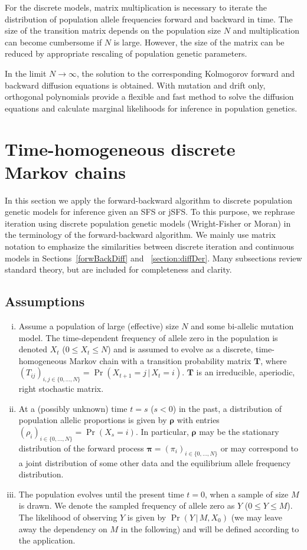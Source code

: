 \documentclass[preprint]{elsarticle}
\newcommand{\bs}[1]{\ensuremath{\boldsymbol{#1}}}
\newcommand\given{{\,|\,}}
\newcommand\x[1]{\ensuremath{X_{#1}}}
\newcommand\y{\ensuremath{Y}}
\newcommand\s{\ensuremath{s}}
\begin{document}
For the discrete models, matrix multiplication is necessary to iterate the distribution of population allele frequencies forward and backward in time. The size of the transition matrix depends on the population size $N$ and multiplication can become cumbersome if $N$ is large. However, the size of the matrix can be reduced by appropriate rescaling of population genetic parameters.

In the limit $N\to\infty$, the solution to the corresponding Kolmogorov forward and backward diffusion equations is obtained. With mutation and drift only, orthogonal polynomials provide a flexible and fast method to solve the diffusion equations and calculate marginal likelihoods for inference in population genetics.

\section{Time-homogeneous discrete Markov chains}

In this section we apply the forward-backward algorithm to discrete population genetic models for inference given an SFS or jSFS. To this purpose, we rephrase iteration using discrete population genetic models (Wright-Fisher or Moran) in the terminology of the forward-backward algorithm. We mainly use matrix notation to emphasize the similarities between discrete iteration and continuous models in Sections~\ref{forwBackDiff} and ~\ref{section:diffDer}. Many subsections review standard theory, but are included for completeness and clarity. 

\subsection{Assumptions}\label{section:assumptions}
\begin{enumerate}[(i)]
\item Assume a population of large (effective) size $N$ and some bi-allelic mutation model. The time-dependent frequency of allele zero in the population is denoted $\x{t}$ ($0 \le \x{t} \le N$) and is assumed to evolve as a discrete, time-homogeneous Markov chain with a transition probability matrix $\mathbf{T}$, where $(T_{ij})_{i,j \in \{0, \ldots, N\}} = \Pr(\x{t+1}=j \given \x{t}=i)$. $\mathbf{T}$ is an irreducible, aperiodic, right stochastic matrix.
\item At a (possibly unknown) time $t=\s$ ($\s<0$) in the past, a distribution of population allelic proportions is given by $\bs{\rho}$ with entries $(\rho_{i})_{i \in \{0, \ldots, N\}} = \Pr(\x{\s}=i)$.  In particular, $\bs{\rho}$ may be the stationary distribution of the forward process $\bs{\pi}=(\pi_i)_{i \in \{0, \ldots, N\}}$ or may correspond to a joint distribution of some other data and the equilibrium allele frequency distribution. 
\item The population evolves until the present time $t=0$, when a sample of size $M$ is drawn.  We denote the sampled frequency of allele zero as $\y$ ($0 \le \y \le M$). The likelihood of observing $\y$ is given by $\Pr(\y \given M, \x{0})$ (we may leave away the dependency on $M$ in the following) and will be defined according to the application.
\end{enumerate}
\end{document}
